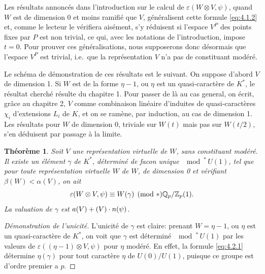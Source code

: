 \documentclass[12pt,a4paper]{article}
\theoremstyle{plain}
\newtheorem{theorem}{Th\'eor\`eme}[section]
\theoremstyle{definition}
\theoremstyle{remark}
\newcommand{\bQ}{\mathbb{Q}}
\newcommand{\bZ}{\mathbb{Z}}
\let\dim\relax\let\det\relax
\begin{document}
Les r\'esultats annonc\'es dans l'introduction sur le calcul de $\varepsilon(W \otimes V, \psi)$, quand $W$ est de dimension 0 et moins ramifi\'e que $V$, g\'en\'eralisent cette formule \eqref{eq:4.1.2} et, comme le lecteur le v\'erifiera ais\'ement, s'y r\'eduisent si l'espace $V^P$ des points fixes par $P$ est non trivial, ce qui, avec les notations de l'introduction, impose $t=0$. Pour prouver ces g\'en\'eralisations, nous supposerons donc d\'esormais que l'espace $V^P$ est trivial, i.e.~que la repr\'esentation $V$ n'a pas de constituant mod\'er\'e.

Le sch\'ema de d\'emonstration de ces r\'esultats est le suivant. On suppose d'abord $V$ de dimension 1. Si $W$ est de la forme $\eta - 1$, ou $\eta$ est un quasi-caract\`ere de $K^*$, le r\'esultat cherch\'e r\'esulte du chapitre 1. Pour passer de l\`a au cas general, on \'ecrit, gr\^ace au chapitre 2, $V$ comme combinaison lin\'eaire d'induites de quasi-caract\`eres $\chi_i$ d'extensions $L_i$ de $K$, et on se ram\`ene, par induction, au cas de dimension 1. Les r\'esultats pour $W$ de dimension 0, triviale sur $W(t)$ mais pas sur $W(t/2)$, s'en d\'eduisent par passage \`a la limite.

\begin{theorem}\label{thm:4.2}
Soit $V$ une repr\'esentation virtuelle de $W$, sans constituant mod\'er\'e. Il existe un \'el\'ement $\gamma$ de $K^*$, d\'etermin\'e de facon unique $\mod^*\, U(1)$, tel que pour toute repr\'esentation virtuelle $W$ de $W$, de dimension 0 et v\'erifiant $\beta(W) < \alpha(V)$, on ait
\begin{equation}\label{eq:4.2.1}
\varepsilon(W \otimes V, \psi) \equiv \det W(\gamma) \pmod{*} \bQ_p/\bZ_p(1).
\end{equation}
La valuation de $\gamma$ est $a(V) + (\dim V) \cdot n(\psi)$.
\end{theorem}

\begin{proof}[D\'emonstration de l'unicit\'e]
L'unicit\'e de $\gamma$ est claire: prenant $W = \eta - 1$, ou $\eta$ est un quasi-caract\`ere de $K^*$, on voit que $\gamma$ est d\'etermin\'e $\mod^*\, U(1)$ par les valeurs de $\varepsilon((\eta-1) \otimes V, \psi)$ pour $\eta$ mod\'er\'e. En effet, la formule \eqref{eq:4.2.1} d\'etermine $\eta(\gamma)$ pour tout caract\`ere $\eta$ de $U(0)/U(1)$, puisque ce groupe est d'ordre premier a $p$.
\end{proof}
\end{document}
